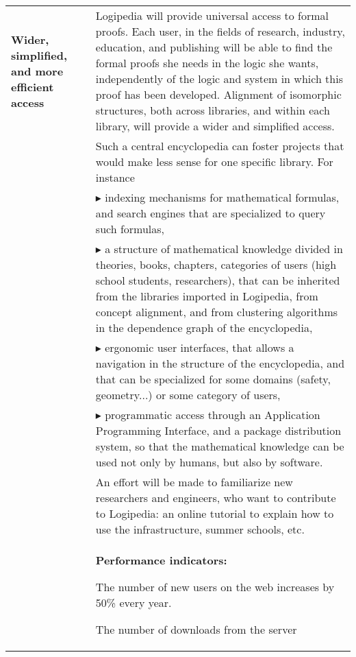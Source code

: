 \begin{longtable}{|p{}|p{}|}
\hline
{\bf Wider, simplified, and more efficient access}&

Logipedia will provide universal access to formal proofs.  Each user,
in the fields of research, industry, education, and publishing will be
able to find the formal proofs she needs in the logic she wants,
independently of the logic and system in which this proof has been
developed.  Alignment of isomorphic structures, both across libraries,
and within each library, will provide a wider and simplified
access.\\ &
\hspace{0.4cm}
Such a central encyclopedia can foster
projects that would make less sense for one specific library. For instance
\\
&
$\blacktriangleright$
indexing mechanisms for mathematical formulas, and search engines
  that are specialized to query such formulas,
\\
&
$\blacktriangleright$
a structure of mathematical knowledge divided in theories, books,
    chapters, categories of users (high school students, researchers),
    that can be inherited from the libraries imported in
      Logipedia, from concept alignment, and from clustering
    algorithms in the dependence graph of the encyclopedia,
\\
&
$\blacktriangleright$
  ergonomic user interfaces, that allows a navigation in the
    structure of the encyclopedia, and that can be specialized for
    some domains (safety, geometry...) or some category of users,
\\
&
$\blacktriangleright$ programmatic access through an Application Programming
    Interface, and a package distribution system, so that the
    mathematical knowledge can be used not only by humans, but also by
    software.\\
&
\hspace{0.4cm}
An effort will be made to familiarize new researchers and engineers,
who want to contribute to Logipedia:
an online tutorial to explain how to use the infrastructure,
summer schools, etc.
\\
&
\colorbox{color2}{\bf Performance indicators:}
\begin{compactitem}
\item The number of new users on the web increases
  by 50\% every year.
\item The number of downloads from the server

\end{compactitem}
\end{longtable}
